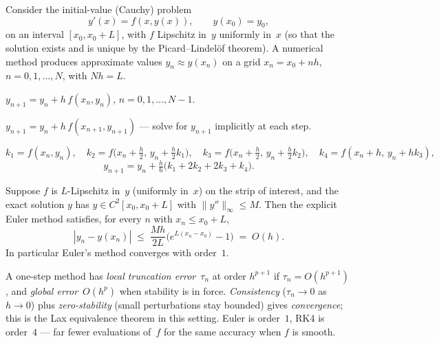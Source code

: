 Consider the initial-value (Cauchy) problem
\[
  y'(x) = f(x, y(x)),\qquad y(x_0) = y_0,
\]
on an interval $[x_0, x_0 + L]$, with $f$ Lipschitz in~$y$ uniformly
in~$x$ (so that the solution exists and is unique by the
Picard--Lindelöf theorem). A numerical method produces approximate
values $y_n \approx y(x_n)$ on a grid $x_n = x_0 + n h$,
$n = 0, 1, \dots, N$, with $N h = L$.

\begin{definition}
\label{def:euler}
$y_{n+1} = y_n + h\, f(x_n, y_n)$, $n = 0, 1, \dots, N - 1$.
\end{definition}

\begin{definition}
\label{def:implicit-euler}
$y_{n+1} = y_n + h\, f(x_{n+1}, y_{n+1})$ — solve for $y_{n+1}$
implicitly at each step.
\end{definition}

\begin{definition}
\label{def:rk4}
\[
  k_1 = f(x_n, y_n),\quad
  k_2 = f\!\bigl(x_n + \tfrac{h}{2},\, y_n + \tfrac{h}{2} k_1\bigr),\quad
  k_3 = f\!\bigl(x_n + \tfrac{h}{2},\, y_n + \tfrac{h}{2} k_2\bigr),\quad
  k_4 = f(x_n + h,\, y_n + h k_3),
\]
\[
  y_{n+1} = y_n + \tfrac{h}{6}\bigl(k_1 + 2 k_2 + 2 k_3 + k_4\bigr).
\]
\end{definition}

\begin{theorem}
\label{thm:euler-convergence}
Suppose $f$ is $L$-Lipschitz in~$y$ (uniformly in~$x$) on the strip
of interest, and the exact solution $y$ has $y \in C^2[x_0, x_0 + L]$
with $\|y''\|_{\infty} \leq M$. Then the explicit Euler method
satisfies, for every $n$ with $x_n \leq x_0 + L$,
\[
  |y_n - y(x_n)| \;\leq\; \frac{M h}{2 L} \bigl(e^{L (x_n - x_0)} - 1\bigr) \;=\; O(h).
\]
In particular Euler's method converges with order~$1$.
\end{theorem}

\begin{remark}
A one-step method has \emph{local truncation error}~$\tau_n$ at order
$h^{p+1}$ if $\tau_n = O(h^{p+1})$, and \emph{global error}~$O(h^p)$
when stability is in force. \emph{Consistency} ($\tau_n \to 0$ as
$h \to 0$) plus \emph{zero-stability} (small perturbations stay
bounded) gives \emph{convergence}; this is the Lax equivalence
theorem in this setting. Euler is order~$1$, RK4 is order~$4$ — far
fewer evaluations of~$f$ for the same accuracy when $f$ is smooth.
\end{remark}

